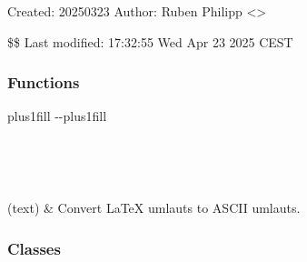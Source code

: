 \documentclass[letterpaper,10pt,english]{sphinxmanual}
\begin{document}
\sphinxAtStartPar
Created: 2025\sphinxhyphen{}03\sphinxhyphen{}23
Author: Ruben Philipp \textless{}\textgreater{}

\sphinxAtStartPar
\$\$ Last modified:  17:32:55 Wed Apr 23 2025 CEST
\subsubsection*{Functions}


\begin{savenotes}
\sphinxatlongtablestart
\sphinxthistablewithglobalstyle
\sphinxthistablewithnovlinesstyle
\makeatletter
  \LTleft \@totalleftmargin plus1fill
  \LTright\dimexpr\columnwidth-\@totalleftmargin-\linewidth\relax plus1fill
\makeatother
\begin{longtable}{}
\sphinxtoprule
\endfirsthead

\\
\sphinxtoprule
\endhead

\sphinxbottomrule
{}\\
\endfoot

\endlastfoot
\sphinxtableatstartofbodyhook

\sphinxAtStartPar
{\hyperref[\detokenize{generated/bp_text.database:bp_text.database.convert_latex_umlauts}]{}}(text)
&
\sphinxAtStartPar
Convert LaTeX umlauts to ASCII umlauts.
\\
\sphinxbottomrule
\end{longtable}
\sphinxtableafterendhook
\sphinxatlongtableend
\end{savenotes}
\subsubsection*{Classes}
\end{document}
